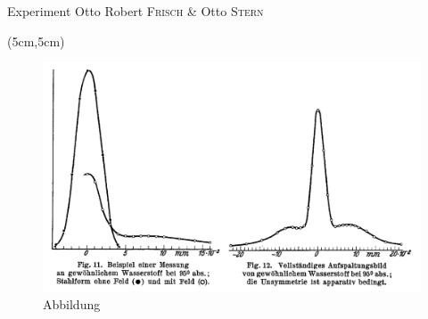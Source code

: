 \documentclass[t,9pt]{beamer}
\begin{document}
        \begin{frame}{Experiment Otto Robert \textsc{Frisch} \& Otto \textsc{Stern}}
                \begin{textblock*}{10cm}(5cm,5cm)
                \end{textblock*}
                \begin{figure}
                        \centering
                        \includegraphics[width=.9\textwidth]{prosi_frisch_stern_auswertung_graph.png}
                        \caption*{Abbildung \cite{FrischStern1933}}
                \end{figure}
        \end{frame}
\end{document}
